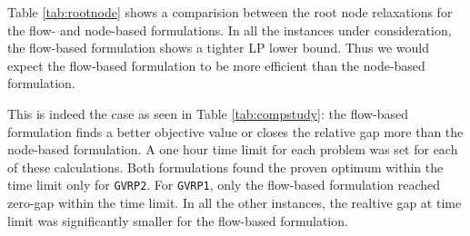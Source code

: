 \documentclass[letterpaper,12pt,onehalfspacing,twoside]{article}
\theoremstyle{msds}
\begin{document}
Table \ref{tab:rootnode} shows a comparision between the root node relaxations for the flow- and node-based formulations. In all the instances under consideration, the flow-based formulation shows a tighter LP lower bound. Thus we would expect the flow-based formulation to be more efficient than the node-based formulation. 

This is indeed the case as seen in Table \ref{tab:compstudy}: the flow-based formulation finds a better objective value or closes the relative gap more than the node-based formulation. A one hour time limit for each problem was set for each of these calculations. Both formulations found the proven optimum within the time limit only for \texttt{GVRP2}. For \texttt{GVRP1}, only the flow-based formulation reached zero-gap within the time limit. In all the other instances, the realtive gap at time limit was significantly smaller for the flow-based formulation.
\end{document}
